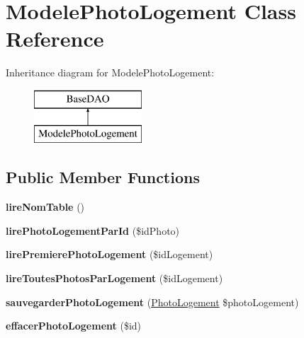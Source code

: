 \hypertarget{class_modele_photo_logement}{}\section{Modele\+Photo\+Logement Class Reference}
\label{class_modele_photo_logement}
Inheritance diagram for Modele\+Photo\+Logement\+:\begin{figure}[H]
\begin{center}
\leavevmode
\includegraphics[height=2.000000cm]{class_modele_photo_logement}
\end{center}
\end{figure}
\subsection*{Public Member Functions}
\begin{DoxyCompactItemize}
\item 
\mbox{\label{class_modele_photo_logement_aa47d5adfc457b64761c33eebff3703f9}} 
{\bfseries lire\+Nom\+Table} ()
\item 
\mbox{\label{class_modele_photo_logement_a46dd91b8610ebd7686ca24ab73daddac}} 
{\bfseries lire\+Photo\+Logement\+Par\+Id} (\$id\+Photo)
\item 
\mbox{\label{class_modele_photo_logement_a8568ac149eaf08da067f9dd246c031a9}} 
{\bfseries lire\+Premiere\+Photo\+Logement} (\$id\+Logement)
\item 
\mbox{\label{class_modele_photo_logement_ab4ca93ecd8010790d80f137c797f1ecd}} 
{\bfseries lire\+Toutes\+Photos\+Par\+Logement} (\$id\+Logement)
\item 
\mbox{\label{class_modele_photo_logement_a6f84bbc489ef3b2343addcdd247aed7e}} 
{\bfseries sauvegarder\+Photo\+Logement} (\hyperlink{class_photo_logement}{Photo\+Logement} \$photo\+Logement)
\item 
\mbox{\label{class_modele_photo_logement_ae0538059995359263a42ffcd52cb1bc1}} 
{\bfseries effacer\+Photo\+Logement} (\$id)
\end{DoxyCompactItemize}
